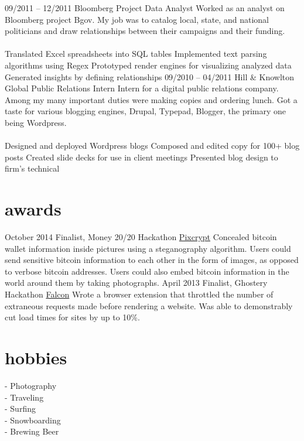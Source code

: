 \documentclass[]{friggeri-cv}
\begin{document}
\tabentry
  {09/2011 – 12/2011}
  {Bloomberg}
  {Project Data Analyst}
  {Worked as an analyst on Bloomberg project Bgov. My job was to catalog local, state, and national politicians and draw relationships between their campaigns and their funding.\\%
  \\%
    \bulletlist
    {Translated Excel spreadsheets into SQL tables}
    {Implemented text parsing algorithms using Regex}
    {Prototyped render engines for visualizing analyzed data}
    {Generated insights by defining relationships }
  }
\tabentry
  {09/2010 – 04/2011}
  {Hill \& Knowlton Global Public Relations}
  {Intern}
  {Intern for a digital public relations company. Among my many important duties were making copies and ordering lunch. Got a taste for various blogging engines, Drupal, Typepad, Blogger, the primary one being Wordpress.\\%
  \\%
    \bulletlist
    {Designed and deployed Wordpress blogs}
    {Composed and edited copy for 100+ blog posts}
    {Created slide decks for use in client meetings}
    {Presented blog design to firm's technical }
  }

\section{awards}

\begin{entrylist}
  \entry
    {October 2014}
    {Finalist, Money 20/20 Hackathon}
    {\href{http://github.com/dopatraman/pixcrypt}{Pixcrypt}}
    {Concealed bitcoin wallet information inside pictures using a steganography algorithm. Users could send sensitive bitcoin information to each other in the form of images, as opposed to verbose bitcoin addresses. Users could also embed bitcoin information in the world around them by taking photographs.}
  \entry
    {April 2013}
    {Finalist, Ghostery Hackathon}
    {\href{http://github.com/dopatraman/FalconExtension}{Falcon}}
    {Wrote a browser extension that throttled the number of extraneous requests made before rendering a website. Was able to demonstrably cut load times for sites by up to 10\%.}
\end{entrylist}

\section{hobbies}

  - Photography\\%
  - Traveling\\%
  - Surfing\\%
  - Snowboarding\\%
  - Brewing Beer\\%
\end{document}

